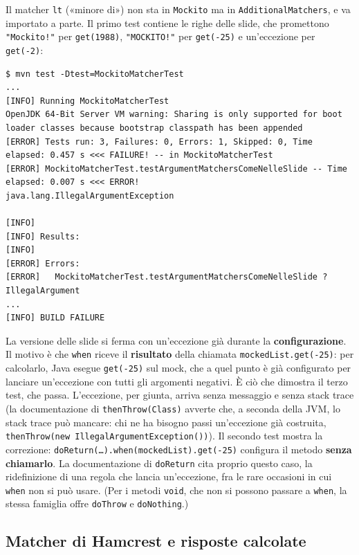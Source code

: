 Il matcher \texttt{lt} («minore di») non sta in \texttt{Mockito} ma in \texttt{AdditionalMatchers}, e va importato a
parte. Il primo test contiene le righe delle slide, che promettono \texttt{"Mockito!"} per \texttt{get(1988)},
\texttt{"MOCKITO!"} per \texttt{get(-25)} e un'eccezione per \texttt{get(-2)}:

\begin{lstlisting}[style=shell, name=Terminale, deletekeywords={java}]
$ mvn test -Dtest=MockitoMatcherTest
...
[INFO] Running MockitoMatcherTest
OpenJDK 64-Bit Server VM warning: Sharing is only supported for boot loader classes because bootstrap classpath has been appended
[ERROR] Tests run: 3, Failures: 0, Errors: 1, Skipped: 0, Time elapsed: 0.457 s <<< FAILURE! -- in MockitoMatcherTest
[ERROR] MockitoMatcherTest.testArgumentMatchersComeNelleSlide -- Time elapsed: 0.007 s <<< ERROR!
java.lang.IllegalArgumentException

[INFO]
[INFO] Results:
[INFO]
[ERROR] Errors:
[ERROR]   MockitoMatcherTest.testArgumentMatchersComeNelleSlide ? IllegalArgument
...
[INFO] BUILD FAILURE
\end{lstlisting}

La versione delle slide si ferma con un'eccezione già durante la \textbf{configurazione}. Il motivo è che
\texttt{when} riceve il \textbf{risultato} della chiamata \texttt{mockedList.get(-25)}: per calcolarlo, Java esegue
\texttt{get(-25)} sul mock, che a quel punto è già configurato per lanciare un'eccezione con tutti gli argomenti negativi.
È ciò che dimostra il terzo test, che passa. L'eccezione, per giunta, arriva senza messaggio e senza stack trace (la
documentazione di \texttt{thenThrow(Class)} avverte che, a seconda della JVM, lo stack trace può mancare: chi ne ha
bisogno passi un'eccezione già costruita, \texttt{thenThrow(new IllegalArgumentException())}). Il secondo test mostra
la correzione: \texttt{doReturn(\ldots).when(mockedList).get(-25)} configura il metodo \textbf{senza chiamarlo}. La
documentazione di \texttt{doReturn} cita proprio questo caso, la ridefinizione di una regola che lancia un'eccezione,
fra le rare occasioni in cui \texttt{when} non si può usare. (Per i metodi \texttt{void}, che non si possono passare a
\texttt{when}, la stessa famiglia offre \texttt{doThrow} e \texttt{doNothing}.)

\subsection{Matcher di Hamcrest e risposte calcolate}

